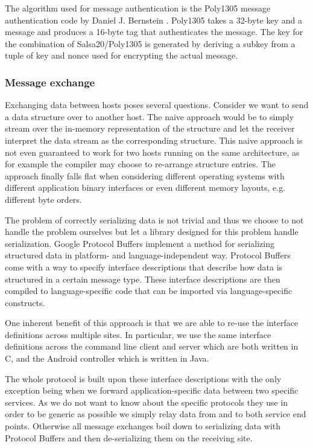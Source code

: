 The algorithm used for message authentication is the Poly1305 message authentication code by Daniel J. Bernstein \cite{bernstein2005poly1305}.
Poly1305 takes a 32-byte key and a message and produces a 16-byte tag that authenticates the message.
The key for the combination of Salsa20/Poly1305 is generated by deriving a subkey from a tuple of key and nonce used for encrypting the actual message.

\subsubsection{Message exchange}

Exchanging data between hosts poses several questions.
Consider we want to send a data structure over to another host.
The naive approach would be to simply stream over the in-memory representation of the structure and let the receiver interpret the data stream as the corresponding structure.
This naive approach is not even guaranteed to work for two hosts running on the same architecture, as for example the compiler may choose to re-arrange structure entries.
The approach finally falls flat when considering different operating systems with different application binary interfaces or even different memory layouts, e.g. different byte orders.

The problem of correctly serializing data is not trivial and thus we choose to not handle the problem ourselves but let a library designed for this problem handle serialization.
Google Protocol Buffers \cite{varda2008protocol} implement a method for serializing structured data in platform- and language-independent way.
Protocol Buffers come with a way to specify interface descriptions that describe how data is structured in a certain message type.
These interface descriptions are then compiled to language-specific code that can be imported via language-specific constructs.

One inherent benefit of this approach is that we are able to re-use the interface definitions across multiple sites.
In particular, we use the same interface definitions across the command line client and server which are both written in C, and the Android controller which is written in Java.

The whole protocol is built upon these interface descriptions with the only exception being when we forward application-specific data between two specific services.
As we do not want to know about the specific protocols they use in order to be generic as possible we simply relay data from and to both service end points.
Otherwise all message exchanges boil down to serializing data with Protocol Buffers and then de-serializing them on the receiving site.

